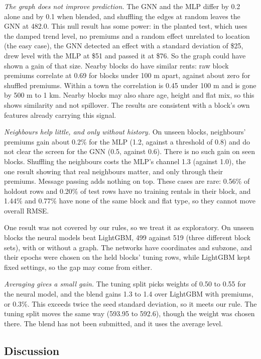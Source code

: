 \emph{The graph does not improve prediction.} The GNN and the MLP differ by 0.2 alone and by 0.1 when blended, and shuffling the edges at random leaves the GNN at 482.0. This null result has some power: in the planted test, which uses the damped trend level, no premiums and a random effect unrelated to location (the easy case), the GNN detected an effect with a standard deviation of \$25, drew level with the MLP at \$51 and passed it at \$76. So the graph could have shown a gain of that size. Nearby blocks do have similar rents: raw block premiums correlate at 0.69 for blocks under 100 m apart, against about zero for shuffled premiums. Within a town the correlation is 0.45 under 100 m and is gone by 500 m to 1 km. Nearby blocks may also share age, height and flat mix, so this shows similarity and not spillover. The results are consistent with a block's own features already carrying this signal.

\emph{Neighbours help little, and only without history.} On unseen blocks, neighbours' premiums gain about 0.2\% for the MLP (1.2, against a threshold of 0.8) and do not clear the screen for the GNN (0.5, against 0.6). There is no such gain on seen blocks. Shuffling the neighbours costs the MLP's channel 1.3 (against 1.0), the one result showing that real neighbours matter, and only through their premiums. Message passing adds nothing on top. These cases are rare: 0.56\% of holdout rows and 0.20\% of test rows have no training rentals in their block, and 1.44\% and 0.77\% have none of the same block and flat type, so they cannot move overall RMSE.

One result was not covered by our rules, so we treat it as exploratory. On unseen blocks the neural models beat LightGBM, 499 against 519 (three different block sets), with or without a graph. The networks have coordinates and subzone, and their epochs were chosen on the held blocks' tuning rows, while LightGBM kept fixed settings, so the gap may come from either.

\emph{Averaging gives a small gain.} The tuning split picks weights of 0.50 to 0.55 for the neural model, and the blend gains 1.3 to 1.4 over LightGBM with premiums, or 0.3\%. This exceeds twice the seed standard deviation, so it meets our rule. The tuning split moves the same way (593.95 to 592.6), though the weight was chosen there. The blend has not been submitted, and it uses the average level.

\subsection{Discussion}
\label{sec:discussion}

